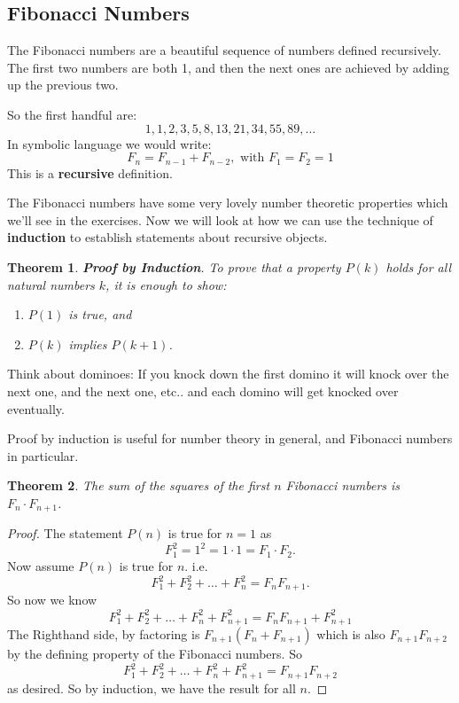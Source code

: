 \documentclass[11pt]{article}
\newtheorem{thm}{Theorem}
\theoremstyle{definition}
\numberwithin{thm}{section}
\begin{document}
\subsection{Fibonacci Numbers}

The Fibonacci numbers are a beautiful sequence of numbers defined recursively. The first two numbers are both 1, and then the next ones are achieved by adding up the previous two.

So the first handful are:
\[
 1,1,2,3,5,8,13,21,34,55,89, \ldots
\]
In symbolic language we would write:
\[
	F_n = F_{n-1} + F_{n-2}, \text{ with } F_1 = F_2 = 1
\]
This is a \textbf{recursive} definition.

The Fibonacci numbers have some very lovely number theoretic properties which we'll see in the exercises. Now we will look at how we can use the technique of \textbf{induction} to establish statements about recursive objects.

\begin{thm} \textbf{Proof by Induction}. To prove that a property $P(k)$ holds for all natural numbers $k$, it is enough to show:
\begin{enumerate}
	\item $P(1)$ is true, and
    \item $P(k)$ implies $P(k+1)$.
\end{enumerate}
\end{thm}

Think about dominoes: If you knock down the first domino it will knock over the next one, and the next one, etc.. and each domino will get knocked over eventually.

Proof by induction is useful for number theory in general, and Fibonacci numbers in particular.

\begin{thm} The sum of the squares of the first $n$ Fibonacci numbers is $F_n \cdot F_{n+1}$.
\end{thm}

\begin{proof} The statement $P(n)$ is true for $n=1$ as 
\[
	F_1^2 = 1^2 = 1 \cdot 1 = F_1 \cdot F_2.
\]
Now assume $P(n)$ is true for $n$. i.e.
\[
	F_1^2 + F_2^2 + \ldots + F_n^2 = F_{n}F_{n+1}.
\]
So now we know
\[
	F_1^2 + F_2^2 + \ldots + F_n^2 + F_{n+1}^2 = F_{n}F_{n+1} + F_{n+1}^2
\]
The Righthand side, by factoring is $F_{n+1}(F_n + F_{n+1})$ which is also $F_{n+1} F_{n+2}$ by the defining property of the Fibonacci numbers. So
\[
	F_1^2 + F_2^2 + \ldots + F_n^2 + F_{n+1}^2 = F_{n+1}F_{n+2}
\]
as desired. So by induction, we have the result for all $n$.
\end{proof}
\end{document}
